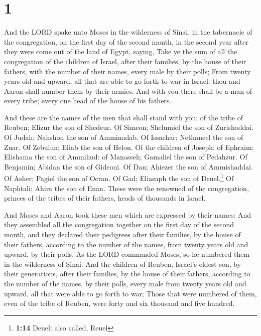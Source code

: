 \hypertarget{section}{%
\section{1}\label{section}}

 And the LORD spake unto Moses in the wilderness of Sinai,
in the tabernacle of the congregation, on the first day of the second
month, in the second year after they were come out of the land of Egypt,
saying,  Take ye the sum of all the congregation of the
children of Israel, after their families, by the house of their fathers,
with the number of their names, every male by their polls;
 From twenty years old and upward, all that are able to go
forth to war in Israel: thou and Aaron shall number them by their
armies.  And with you there shall be a man of every tribe;
every one head of the house of his fathers.

 And these are the names of the men that shall stand with
you: of the tribe of Reuben; Elizur the son of Shedeur. 
Of Simeon; Shelumiel the son of Zurishaddai.  Of Judah;
Nahshon the son of Amminadab.  Of Issachar; Nethaneel the
son of Zuar.  Of Zebulun; Eliab the son of Helon.
 Of the children of Joseph: of Ephraim; Elishama the son
of Ammihud: of Manasseh; Gamaliel the son of Pedahzur. 
Of Benjamin; Abidan the son of Gideoni.  Of Dan; Ahiezer
the son of Ammishaddai.  Of Asher; Pagiel the son of
Ocran.  Of Gad; Eliasaph the son of Deuel.\footnote{\textbf{1:14}
  Deuel: also called, Reuel}  Of Naphtali; Ahira the son
of Enan.  These were the renowned of the congregation,
princes of the tribes of their fathers, heads of thousands in Israel.

 And Moses and Aaron took these men which are expressed
by their names:  And they assembled all the congregation
together on the first day of the second month, and they declared their
pedigrees after their families, by the house of their fathers, according
to the number of the names, from twenty years old and upward, by their
polls.  As the LORD commanded Moses, so he numbered them
in the wilderness of Sinai.  And the children of Reuben,
Israel's eldest son, by their generations, after their families, by the
house of their fathers, according to the number of the names, by their
polls, every male from twenty years old and upward, all that were able
to go forth to war;  Those that were numbered of them,
even of the tribe of Reuben, were forty and six thousand and five
hundred.

